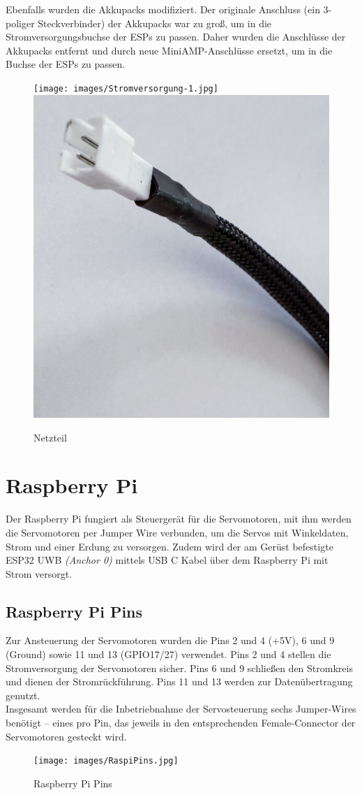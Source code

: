 Ebenfalls wurden die Akkupacks modifiziert. Der originale Anschluss (ein 3-poliger Steckverbinder) der Akkupacks war zu groß, um in die Stromversorgungsbuchse der ESPs zu passen. Daher wurden die Anschlüsse der Akkupacks entfernt und durch neue MiniAMP-Anschlüsse ersetzt, um in die Buchse der ESPs zu passen.

\begin{figure}[H]
	\centering
	\texttt{[image: images/Stromversorgung-1.jpg]}
	\includegraphics[width=0.4\linewidth]{images/Stromversorgung-2.jpg}
	\caption[Netzteil]{Netzteil}
	\label{fig:Netzteil}
\end{figure}

\section{Raspberry Pi}
Der Raspberry Pi fungiert als Steuergerät für die Servomotoren, mit ihm werden die Servomotoren per Jumper Wire verbunden, um die Servos mit Winkeldaten, Strom und einer Erdung zu versorgen. Zudem wird der am Gerüst befestigte ESP32 UWB \textit{(Anchor 0)} mittels USB C Kabel über dem Raspberry Pi mit Strom versorgt. 

\subsection{Raspberry Pi Pins}
Zur Ansteuerung der Servomotoren wurden die Pins 2 und 4 (+5V), 6 und 9 (Ground) sowie 11 und 13 (GPIO17/27) verwendet. Pins 2 und 4 stellen die Stromversorgung der Servomotoren sicher. Pins 6 und 9 schließen den Stromkreis und dienen der Stromrückführung. Pins 11 und 13 werden zur Datenübertragung genutzt.\\
Insgesamt werden für die Inbetriebnahme der Servosteuerung sechs Jumper-Wires benötigt – eines pro Pin, das jeweils in den entsprechenden Female-Connector der Servomotoren gesteckt wird.

\begin{figure}[H]
	\centering
	\texttt{[image: images/RaspiPins.jpg]}
	\caption[Raspberry Pi Pins]{Raspberry Pi Pins}
	\label{fig: Raspberry Pi Pins}
\end{figure}


